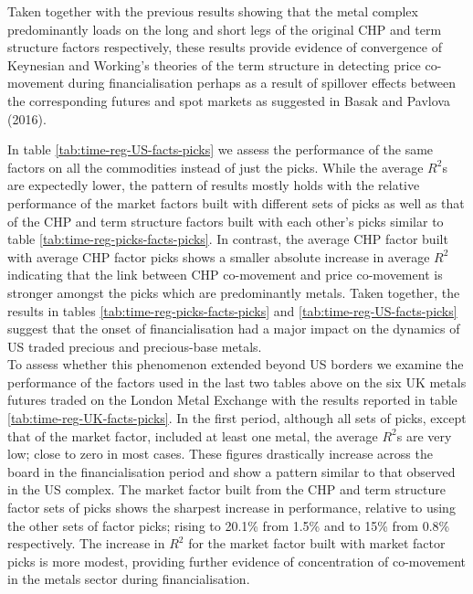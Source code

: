 \documentclass[]{elsarticle} %
\begin{document}
Taken together with the previous results showing that the metal complex predominantly loads on the long and short legs of the original CHP and term structure factors respectively, these results provide evidence of convergence of Keynesian and Working's theories of the term structure in detecting price co-movement during financialisation perhaps as a result of spillover effects between the corresponding futures and spot markets as suggested in Basak and Pavlova (2016).

\medskip\setlength{\parindent}{0pt}

In table \ref{tab:time-reg-US-facts-picks} we assess the performance of the same factors on all the commodities instead of just the picks. While the average \(R^{2}\)s are expectedly lower, the pattern of results mostly holds with the relative performance of the market factors built with different sets of picks as well as that of the CHP and term structure factors built with each other's picks similar to table \ref{tab:time-reg-picks-facts-picks}. In contrast, the average CHP factor built with average CHP factor picks shows a smaller absolute increase in average \(R^{2}\) indicating that the link between CHP co-movement and price co-movement is stronger amongst the picks which are predominantly metals. Taken together, the results in tables \ref{tab:time-reg-picks-facts-picks} and \ref{tab:time-reg-US-facts-picks} suggest that the onset of financialisation had a major impact on the dynamics of US traded precious and precious-base metals.\\
To assess whether this phenomenon extended beyond US borders we examine the performance of the factors used in the last two tables above on the six UK metals futures traded on the London Metal Exchange with the results reported in table \ref{tab:time-reg-UK-facts-picks}. In the first period, although all sets of picks, except that of the market factor, included at least one metal, the average \(R^{2}\)s are very low; close to zero in most cases. These figures drastically increase across the board in the financialisation period and show a pattern similar to that observed in the US complex. The market factor built from the CHP and term structure factor sets of picks shows the sharpest increase in performance, relative to using the other sets of factor picks; rising to 20.1\% from 1.5\% and to 15\% from 0.8\% respectively. The increase in \(R^{2}\) for the market factor built with market factor picks is more modest, providing further evidence of concentration of co-movement in the metals sector during financialisation.\\
\end{document}
